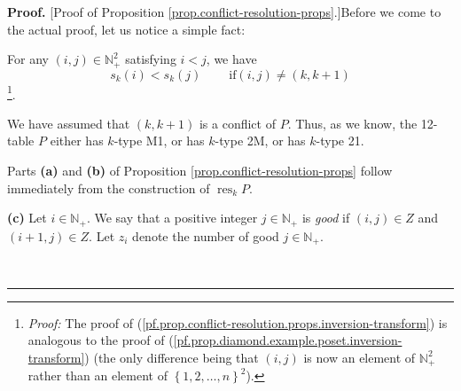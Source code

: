 \documentclass[numbers=enddot,12pt,final,onecolumn,notitlepage]{scrartcl}%
\theoremstyle{definition}
\newenvironment{proof}[1][Proof]{\noindent\textbf{#1.} }{\ \rule{0.5em}{0.5em}}
\newenvironment{verlong}{}{}
\begin{document}
\begin{verlong}
\begin{proof}
[Proof of Proposition \ref{prop.conflict-resolution-props}.]Before we come to
the actual proof, let us notice a simple fact:

For any $\left(  i,j\right)  \in\mathbb{N}_{+}^{2}$ satisfying $i<j$, we have%
\begin{equation}
s_{k}\left(  i\right)  <s_{k}\left(  j\right)  \ \ \ \ \ \ \ \ \ \ \text{if
}\left(  i,j\right)  \neq\left(  k,k+1\right)
\label{pf.prop.conflict-resolution.props.inversion-transform}%
\end{equation}
\footnote{\textit{Proof:} The proof of
(\ref{pf.prop.conflict-resolution.props.inversion-transform}) is analogous to
the proof of (\ref{pf.prop.diamond.example.poset.inversion-transform}) (the
only difference being that $\left(  i,j\right)  $ is now an element of
$\mathbb{N}_{+}^{2}$ rather than an element of $\left\{  1,2,\ldots,n\right\}
^{2}$).}.

We have assumed that $\left(  k,k+1\right)  $ is a conflict of $P$. Thus, as
we know, the 12-table $P$ either has $k$-type M1, or has $k$-type 2M, or has
$k$-type 21.

Parts \textbf{(a)} and \textbf{(b)} of Proposition
\ref{prop.conflict-resolution-props} follow immediately from the construction
of $\operatorname*{res}\nolimits_{k}P$.

\textbf{(c)} Let $i\in\mathbb{N}_{+}$. We say that a positive integer
$j\in\mathbb{N}_{+}$ is \textit{good} if $\left(  i,j\right)  \in Z$ and
$\left(  i+1,j\right)  \in Z$. Let $z_{i}$ denote the number of good
$j\in\mathbb{N}_{+}$.


\end{proof}
\end{verlong}
\end{document}

